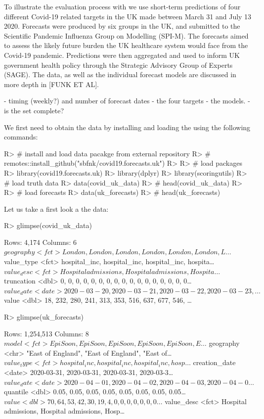 \documentclass[article,shortnames]{jss}
\begin{document}
To illustrate the evaluation process with  we use short-term predictions of four different Covid-19 related targets in the UK made between March 31 and July 13 2020. Forecasts were produced by six groups in the UK, and submitted to the Scientific Pandemic Influenza Group on Modelling (SPI-M). The forecasts aimed to assess the likely future burden the UK healthcare system would face from the Covid-19 pandemic. Predictions were then aggregated and used to inform UK government health policy through the Strategic Advisory Group of Experts (SAGE). The data, as well as the individual forecast models are discussed in more depth in [FUNK ET AL]. 

- timing (weekly?) and number of forecast dates
- the four targets
- the models. 
- is the set complete?

We first need to obtain the data by installing and loading the  using the following commands: 
% 
\begin{Schunk}
\begin{Sinput}
R> # install and load data pacakge from external repository
R> # remotes::install_github("sbfnk/covid19.forecasts.uk")
R> 
R> # load packages
R> library(covid19.forecasts.uk)
R> library(dplyr)
R> library(scoringutils)
R> # load truth data
R> data(covid_uk_data)
R> # head(covid_uk_data)
R> 
R> # load forecasts
R> data(uk_forecasts)
R> # head(uk_forecasts)
\end{Sinput}
\end{Schunk}
% 
Let us take a first look a the data:
% 
\begin{Schunk}
\begin{Sinput}
R> glimpse(covid_uk_data)
\end{Sinput}
\begin{Soutput}
Rows: 4,174
Columns: 6
$ geography  <fct> London, London, London, London, London, London, L…
$ value_type <fct> hospital_inc, hospital_inc, hospital_inc, hospita…
$ value_desc <fct> Hospital admissions, Hospital admissions, Hospita…
$ truncation <dbl> 0, 0, 0, 0, 0, 0, 0, 0, 0, 0, 0, 0, 0, 0, 0, 0, 0…
$ value_date <date> 2020-03-20, 2020-03-21, 2020-03-22, 2020-03-23, …
$ value      <dbl> 18, 232, 280, 241, 313, 353, 516, 637, 677, 546, …
\end{Soutput}
\begin{Sinput}
R> glimpse(uk_forecasts)
\end{Sinput}
\begin{Soutput}
Rows: 1,254,513
Columns: 8
$ model         <fct> EpiSoon, EpiSoon, EpiSoon, EpiSoon, EpiSoon, E…
$ geography     <chr> "East of England", "East of England", "East of…
$ value_type    <fct> hospital_inc, hospital_inc, hospital_inc, hosp…
$ creation_date <date> 2020-03-31, 2020-03-31, 2020-03-31, 2020-03-3…
$ value_date    <date> 2020-04-01, 2020-04-02, 2020-04-03, 2020-04-0…
$ quantile      <dbl> 0.05, 0.05, 0.05, 0.05, 0.05, 0.05, 0.05, 0.05…
$ value         <dbl> 70, 64, 53, 42, 30, 19, 4, 0, 0, 0, 0, 0, 0, 0…
$ value_desc    <fct> Hospital admissions, Hospital admissions, Hosp…
\end{Soutput}
\end{Schunk}
\end{document}
